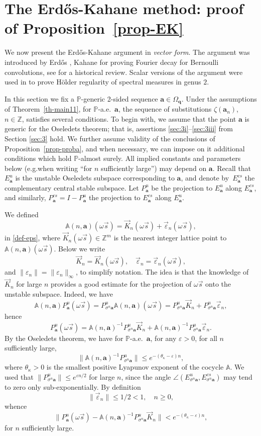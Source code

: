 \documentclass[10pt]{amsart}
\let\epsilon\varepsilon
\theoremstyle{plain}
\theoremstyle{definition}
\newcommand\bom{{\boldsymbol a}}\let\ba\bom
\newcommand\bq{{\boldsymbol q}}
\let\eps\varepsilon
\let\om\omega
\let\Om\Omega
\let\sig\sigma
\newcommand\Aa{\mathbb{A}}
\newcommand{\Z}{\mathbb{Z}}
\renewcommand{\P}{\mathbb{P}}
\newcommand\be{\begin{equation}}
\newcommand\ee{\end{equation}}
\providecommand{\eg}{e.g.}\providecommand{\ie}{i.e.}\providecommand{\etc}{etc.}\providecommand{\resp}{resp.}\providecommand{\cf}{cf.}
\begin{document}
\section{The Erd\H{o}s-Kahane method: proof of Proposition~\ref{prop-EK} }

We now present the Erd\H{o}s-Kahane argument in {\it vector form}. The argument was introduced by Erd\H{o}s \cite{Erd} , Kahane \cite{Kahane} for proving Fourier decay for Bernoulli convolutions, see \cite{sixty} for a historical review. Scalar versions of the argument were used in \cite{BuSol2,BuSo18a} to prove Hölder regularity of spectral measures in genus $2$.

In this section we fix a $\P$-generic 2-sided sequence $\bom\in \Om_\bq$.
Under the assumptions of Theorem~\ref{th-main11}, for $\P$-a.e.\ $\bom$, the sequence of substitutions $\zeta(\bom_n)$,
$n\in \Z$, satisfies several conditions.
To begin with, we assume that the point $\bom$ is generic for the Oseledets theorem; that is, assertions \eqref{sec:3i}--\eqref{sec:3iii} from Section \ref{sec:3} hold. We further assume validity of the conclusions
of Proposition~\ref{prop-proba}, and when necessary, we can impose on it additional conditions which hold $\P$-almost surely.
All implied constants and parameters below (\eg when writing ``for $n$ sufficiently large'') may depend on $\bom$.
Recall that $E^u_\bom$ is the unstable Oseledets subspace corresponding to $\bom$, and denote by~$E^{cs}_\bom$ the complementary central stable subspace. Let $P^u_\bom$ be the
projection to $E^u_\bom$ along $E^{cs}_\bom$, and similarly, $P^{cs}_\bom = I - P^u_\bom$ the projection to $E^{cs}_\bom$ along $E^u_\bom$.

We defined
\[
\Aa(n,\bom) (\om\vec s) = \vec{K}_n(\om\vec s) + \vec{\eps}_n(\om\vec s),
\]
in \eqref{def-eps}, where $\vec K_n(\om\vec s)\in \Z^m$ is the nearest integer lattice point to $\Aa(n,\bom) (\om\vec s)$. Below we write
\[
\vec K_n = \vec{K}_n(\om\vec s),\quad \vec\eps_n = \vec{\eps}_n(\om\vec s),
\]
and $\|\eps_n\| = \|\eps_n\|_\infty$,
to simplify notation.
The idea is that the knowledge of $\vec K_n$ for large $n$ provides a good estimate for the projection of $\om\vec s$ onto the unstable subspace. Indeed, we have
\[
\Aa(n,\bom) P_\bom^u(\om\vec s)=P_{\sig^n\bom}^u \Aa(n,\bom) (\om\vec s)= P_{\sig^n\bom}^u \vec{K}_n + P_{\sig^n\bom}^u \vec{\eps}_n,
\]
hence
\[
P^u_\bom(\om\vec s) = \Aa(n,\bom)^{-1} P_{\sig^n\bom}^u \vec{K}_n + \Aa(n,\bom)^{-1} P_{\sig^n\bom}^u \vec{\eps}_n.
\]
By the Oseledets theorem, we have for $\P$-a.e.\ $\bom$, for any $\epsilon>0$, for all $n$ sufficiently large,
\[
\|\Aa(n,\bom)^{-1}P^u_{\sig^n\bom}\|\le e^{-(\theta_\kappa-\epsilon)n},
\]
where $\theta_\kappa>0$ is the smallest positive Lyapunov exponent of the cocycle $\Aa$.
We used that $\|P^u_{\sig^n\bom}\|\le e^{\eps n/2}$ for large $n$, since the angle $\angle(E^u_{\sig^n\bom}, E^{cs}_{\sig^n\bom})$ may tend to zero only sub-exponentially.
By definition
\be \label{up1}
\|\vec{\eps}_n\|\le 1/2<1,\quad n\ge 0,
\ee
whence
\be \label{good-est}
\|P^u_\bom(\om\vec s) -\Aa(n,\bom)^{-1} P_{\sig^n\bom}^u \vec{K}_n\| < e^{-(\theta_\kappa-\epsilon)n},
\ee
for $n$ sufficiently large.
\end{document}
